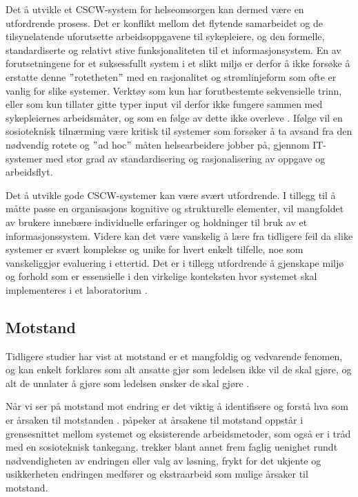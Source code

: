 \noindent
Det å utvikle et CSCW-system for helseomsorgen kan dermed være en utfordrende prosess. Det er konflikt mellom det flytende samarbeidet og de tilsynelatende uforutsette arbeidsoppgavene til sykepleiere, og den formelle, standardiserte og relativt stive funksjonaliteten til et informasjonsystem. En av forutsetningene for et suksessfullt system i et slikt miljø er derfor å ikke forsøke å erstatte denne $"$rotetheten$"$ med en rasjonalitet og strømlinjeform som ofte er vanlig for slike systemer. Verktøy som kun har forutbestemte sekvensielle trinn, eller som kun tillater gitte typer input vil derfor ikke fungere sammen med sykepleiernes arbeidsmåter, og som en følge av dette ikke overleve \citep{Berg99}.
Ifølge \citet{Berg99} vil en sosioteknisk tilnærming være kritisk til systemer som forsøker å ta avsand fra den nødvendig rotete og $"$ad hoc$"$ måten helsearbeidere jobber på, gjennom IT-systemer med stor grad av standardisering og rasjonalisering av oppgave og arbeidsflyt.

\noindent
Det å utvikle gode CSCW-systemer kan være svært utfordrende. I tillegg til å måtte passe en organisasjons kognitive og strukturelle elementer, vil mangfoldet av brukere innebære individuelle erfaringer og holdninger til bruk av et informasjonssystem. Videre kan det være vanskelig å lære fra tidligere feil da slike systemer er svært komplekse og unike for hvert enkelt tilfelle, noe som vanskeliggjør evaluering i ettertid. Det er i tillegg utfordrende å gjenskape miljø og forhold som er essensielle i den virkelige konteksten hvor systemet skal implementeres i et laboratorium \citep{Berg99}.

\subsection{Motstand}
\label{sec:motstand}
Tidligere studier har vist at motstand er et mangfoldig og vedvarende fenomen, og kan enkelt forklares som alt ansatte gjør som ledelsen ikke vil de skal gjøre, og alt de unnlater å gjøre som ledelsen ønsker de skal gjøre \citep{Timmons03}.
 
\noindent
Når vi ser på motstand mot endring er det viktig å identifisere og forstå hva som er årsaken til motstanden \citep{Lapointe05}. \citet{Timmons03} påpeker at årsakene til motstand oppstår i grensesnittet mellom systemet og eksisterende arbeidsmetoder, som også er i tråd med en sosioteknisk tankegang. \citet{Jacobsen12} trekker blant annet frem faglig uenighet rundt nødvendigheten av endringen eller valg av løsning, frykt for det ukjente og usikkerheten endringen medfører og ekstraarbeid som mulige årsaker til motstand.
 

